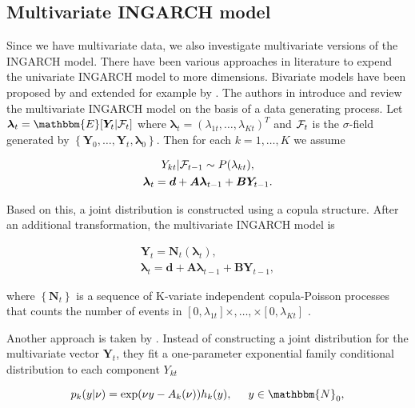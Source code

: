 \subsection{Multivariate INGARCH model}
\label{sec: Multivariate Ingarch}

Since we have multivariate data, we also investigate multivariate versions of the INGARCH model. There have been various approaches in literature to expend the univariate INGARCH model to more dimensions. Bivariate models have been proposed by \cite{Liu:2012} and  extended for example by \cite{Cui:2018}. The authors in \cite{Fokianos:2020,Fokianos:2021} introduce and review the multivariate INGARCH model on the basis of a data generating process. Let $\bm{\lambda}_t=\mathbbm{E}[\bm{Y}_t|\SigA_t]$ where $\bm{\lambda}_t = (\lambda_{1t},\ldots,\lambda_{Kt})^T$ and $\mathcal{F}_t$ is the $\sigma$-field generated by $\left\{\bm{Y}_0,\ldots,\bm{Y}_t,\bm{\lambda}_0\right\}$. Then for each $k=1,\ldots,K$ we assume

\begin{gather}
Y_{kt} | \mathcal{F}_{t-1} \sim P(\lambda_{kt}), \\
\bm{\lambda}_t = \bm{d} + \bm{A}\bm{\lambda}_{t-1} + \bm{B}\bm{Y}_{t-1}.
\label{eq:Mingarch 1}
\end{gather}

Based on this, a joint distribution is constructed using a copula structure. After an additional transformation, the multivariate INGARCH model is

\begin{gather}
\bm{Y}_t = \bm{N}_t(\bm{\lambda}_t), \\
\bm{\lambda}_t = \bm{d} + \bm{A}\bm{\lambda}_{t-1} + \bm{B}\bm{Y}_{t-1},
\label{eq:Mingarch 1 new}
\end{gather}

where $\left\{\bm{N}_t\right\}$ is a sequence of K-variate independent copula-Poisson processes that counts the number of events in $[0,\lambda_{1t}]\times,\ldots,\times[0,\lambda_{Kt}]$ \cite{Fokianos:2020}. 

Another approach is taken by \cite{Lee:2023}. Instead of constructing a joint distribution for the multivariate vector $\bm{Y}_t$, they fit a one-parameter exponential family conditional distribution to each component $Y_{kt}$

\begin{equation}
p_{k}(y|\nu) = \exp(\nu y - A_k(\nu))h_k(y), \hspace{0.5cm} y \in \mathbbm{N}_0,
\label{eq:Exponential Family}
\end{equation}

